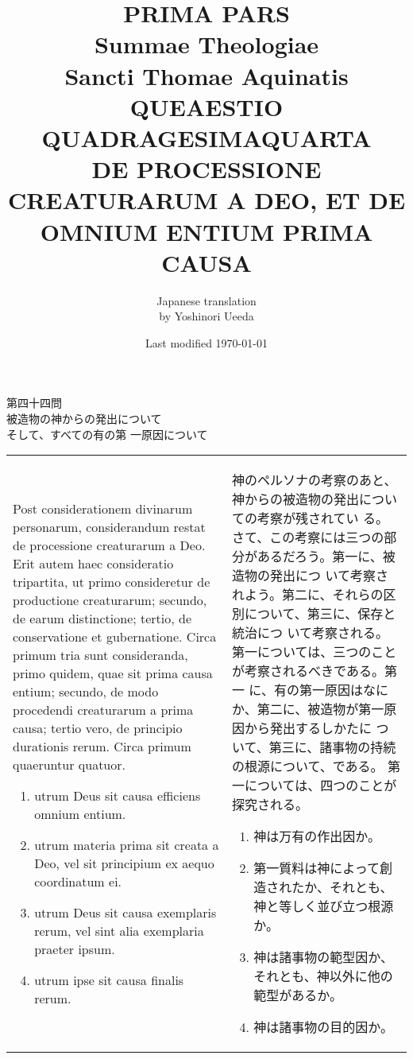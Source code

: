 \documentclass[10pt]{jsarticle} %
\title{{\bf PRIMA PARS}\\{\HUGE Summae Theologiae}\\Sancti Thomae
Aquinatis\\{\sffamily QUEAESTIO QUADRAGESIMAQUARTA}\\DE PROCESSIONE
CREATURARUM A DEO, ET DE OMNIUM ENTIUM PRIMA CAUSA}
\author{Japanese translation\\by Yoshinori {\sc Ueeda}}
\date{Last modified \today}
\begin{document}
\maketitle

\begin{center}
{\Large 第四十四問\\被造物の神からの発出について\\そして、すべての有の第
 一原因について}
\end{center}

\begin{longtable}{p{21em}p{21em}}

Post considerationem divinarum personarum, considerandum restat de
 processione creaturarum a Deo. Erit autem haec consideratio tripartita,
 ut primo consideretur de productione creaturarum; secundo, de earum
 distinctione; tertio, de conservatione et gubernatione. Circa primum
 tria sunt consideranda, primo quidem, quae sit prima causa entium;
 secundo, de modo procedendi creaturarum a prima causa; tertio vero, de
 principio durationis rerum. Circa primum quaeruntur quatuor. 

\begin{enumerate}
 \item utrum Deus sit causa efficiens omnium entium.
 \item utrum materia
 prima sit creata a Deo, vel sit principium ex aequo coordinatum
 ei.
 \item utrum Deus sit causa exemplaris rerum, vel sint alia
 exemplaria praeter ipsum.
 \item utrum ipse sit causa finalis rerum.
\end{enumerate}

&

神のペルソナの考察のあと、神からの被造物の発出についての考察が残されてい
 る。さて、この考察には三つの部分があるだろう。第一に、被造物の発出につ
 いて考察されよう。第二に、それらの区別について、第三に、保存と統治につ
 いて考察される。第一については、三つのことが考察されるべきである。第一
 に、有の第一原因はなにか、第二に、被造物が第一原因から発出するしかたに
 ついて、第三に、諸事物の持続の根源について、である。
第一については、四つのことが探究される。
\begin{enumerate}
 \item 神は万有の作出因か。
 \item 第一質料は神によって創造されたか、それとも、神と等しく並び立つ根源
 か。
 \item 神は諸事物の範型因か、それとも、神以外に他の範型があるか。
 \item 神は諸事物の目的因か。
\end{enumerate}

\end{longtable}
\end{document}

